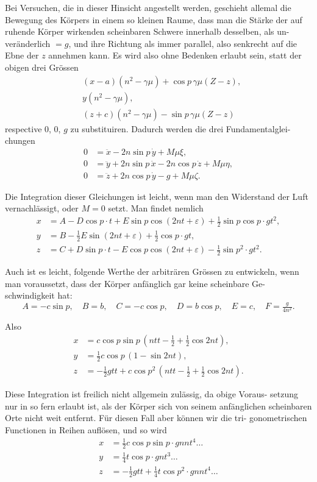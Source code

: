 \documentclass[12pt,a4paper]{article}
\begin{document}
Bei Versuchen, die in dieser Hinsicht angestellt werden, geschieht allemal 
die Bewegung des Körpers in einem so kleinen Raume, dass man die Stärke der 
auf ruhende Körper wirkenden scheinbaren Schwere innerhalb desselben, als un-
veränderlich $= g$, und ihre Richtung als immer parallel, also senkrecht auf die 
Ebne der $z$ annehmen kann. Es wird also ohne Bedenken erlaubt sein, statt 
der obigen drei Grössen
\begin{align*}
&(x-a)(n^2 - \gamma\mu) + \cos p\,\gamma\mu(Z-z),\\
&y(n^2 - \gamma\mu),\\
&(z+c)(n^2 - \gamma\mu) - \sin p\,\gamma\mu(Z-z)
\end{align*}
respective $0$, $0$, $g$ zu substituiren. Dadurch werden die drei Fundamentalglei-
chungen
\begin{align}
0 &= \ddot{x} - 2n\sin p\,\dot{y} + M\mu\xi,\\
0 &= \ddot{y} + 2n\sin p\,\dot{x} - 2n\cos p\,\dot{z} + M\mu\eta,\\
0 &= \ddot{z} + 2n\cos p\,\dot{y} - g + M\mu\zeta.
\end{align}

Die Integration dieser Gleichungen ist leicht, wenn man den Widerstand 
der Luft vernachlässigt, oder $M = 0$ setzt. Man findet nemlich
\begin{align*}
x &= A - D\cos p\cdot t + E\sin p\cos(2nt + \varepsilon) + \tfrac{1}{2}\sin p\cos p\cdot gt^2,\\
y &= B - \tfrac{1}{2}E\sin(2nt + \varepsilon) + \tfrac{1}{2}\cos p\cdot gt,\\
z &= C + D\sin p\cdot t - E\cos p\cos(2nt + \varepsilon) - \tfrac{1}{2}\sin p^2\cdot gt^2.
\end{align*}

Auch ist es leicht, folgende Werthe der arbiträren Grössen zu entwickeln, 
wenn man voraussetzt, dass der Körper anfänglich gar keine scheinbare Ge-
schwindigkeit hat:
\[
A = -c\sin p,\quad B = b,\quad C = -c\cos p,\quad D = b\cos p,\quad E = c,\quad F = \tfrac{g}{4n^2}.
\]

Also
\begin{align*}
x &= c\cos p\sin p\,(ntt - \tfrac{1}{2} + \tfrac{1}{2}\cos 2nt),\\
y &= \tfrac{1}{2}c\cos p\,(1 - \sin 2nt),\\
z &= -\tfrac{1}{2}gtt + c\cos p^2\,(ntt - \tfrac{1}{2} + \tfrac{1}{2}\cos 2nt).
\end{align*}

Diese Integration ist freilich nicht allgemein zulässig, da obige Voraus-
setzung nur in so fern erlaubt ist, als der Körper sich von seinem anfänglichen 
scheinbaren Orte nicht weit entfernt. Für diesen Fall aber können wir die tri-
gonometrischen Functionen in Reihen auflösen, und so wird
\begin{align*}
x &= \tfrac{1}{2}c\cos p\sin p\cdot gnnt^4 \ldots\\
y &= \tfrac{1}{4}t\cos p\cdot gnt^3 \ldots\\
z &= -\tfrac{1}{2}gtt + \tfrac{1}{4}t\cos p^2\cdot gnnt^4 \ldots
\end{align*}
\end{document}
